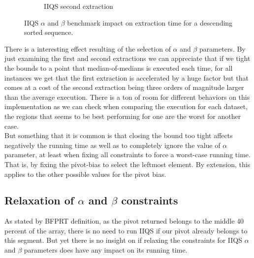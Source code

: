 \begin{figure}
\begin{subfigure}[b]{0.45\textwidth}
        \caption{IIQS second extraction}
        \label{FIG:05_ALPHABETA_RELATIONSHIP_DESC__0_1}
    \end{subfigure}

    \caption{IIQS $\alpha$ and $\beta$ benchmark impact on extraction time for a descending sorted sequence.}
    \label{FIG:05_ALPHABETA_RELATIONSHIP_DESC}
\end{figure}



There is a interesting effect resulting of the selection of $\alpha$ and $\beta$ parameters. By just examining the first and second extractions we can appreciate that if we tight the bounds to a point that median-of-medians is executed each time, for all instances we get that the first extraction is accelerated by a huge factor but that comes at a cost of the second extraction being three orders of magnitude larger than the average execution. There is a ton of room for different behaviors on this implementation as we can check when comparing the execution for each dataset, the regions that seems to be best performing for one are the worst for another case.\\

But something that it is common is that closing the bound too tight affects negatively the running time as well as to completely ignore the value of $\alpha$ parameter, at least when fixing all constraints to force a worst-case running time. That is, by fixing the pivot-bias to select the leftmost element. By extension, this applies to the other possible values for the pivot bias. \\


\subsection{Relaxation of $\alpha$ and $\beta$ constraints}

As stated by BFPRT definition, as the pivot returned belongs to the middle 40 percent of the array, there is no need to run IIQS if our pivot already belongs to this segment. But yet there is no insight on if relaxing the constraints for IIQS $\alpha$ and $\beta$ parameters does have any impact on its running time.\\

